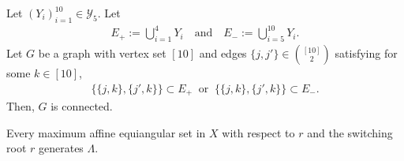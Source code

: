 \documentclass[10pt,a4paper]{amsart}
\newcommand{\cY}{\mathcal{Y}}
\newcommand{\sr}{ r } %
\begin{document}
\begin{lem}	\label{lem:con}
	Let $(Y_i)_{i=1}^{10} \in \cY_5$.
	Let
	\begin{align}
		E_+ := \bigcup_{i=1}^4 Y_i \quad \text{and} \quad E_- := \bigcup_{i=5}^{10} Y_i.
		\label{lem:con:Epm}
	\end{align}
	Let $G$ be a graph with vertex set $[10]$ and edges $\{j,j'\} \in \binom{[10]}{2}$ satisfying for some $k \in [10]$,
	\begin{align}	\label{lem:con:0}
		\{\{j,k\}, \{j',k\}\} \subset E_+ \ \text{ or }\ \{\{j,k\}, \{j',k\}\} \subset E_-.
	\end{align}
	Then, $G$ is connected.
\end{lem}

\begin{lem}	\label{lem:genL}
	Every maximum affine equiangular set in $X$ with respect to $\sr$ and the switching root $\sr$ generates $\Lambda$.
\end{lem}
\end{document}
